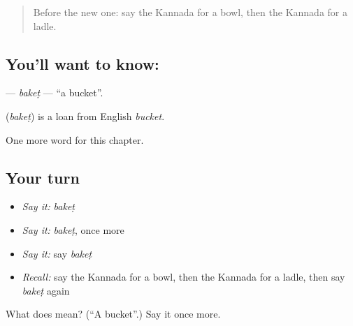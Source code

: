 \label{lesson:KA-C183-baket}



\begin{quote}
Before the new one: say the Kannada for a bowl, then the Kannada for a ladle.
\end{quote}

\subsection*{You'll want to know: }
\textbf{} — \emph{bakeṭ} — \textquotedblleft{}a bucket\textquotedblright{}.

\begin{cousinweb}
\textbf{} (\emph{bakeṭ}) is a loan from English \emph{bucket}.
\end{cousinweb}

\begin{grammarlens}[title={What you've built}]
One more word for this chapter.
\end{grammarlens}

\subsection*{Your turn}
\begin{itemize}
\raggedright
  \item \emph{Say it:} \emph{bakeṭ}
  \item \emph{Say it:} \emph{bakeṭ}, once more
  \item \emph{Say it:} say \emph{bakeṭ}
  \item \emph{Recall:} say the Kannada for a bowl, then the Kannada for a ladle, then say \emph{bakeṭ} again
\end{itemize}

\begin{tcolorbox}[breakable,colback=teal!4,colframe=teal!35!black,title={Before you move on}]
What does  mean? (\textquotedblleft{}A bucket\textquotedblright{}.) Say it once more.
\end{tcolorbox}
